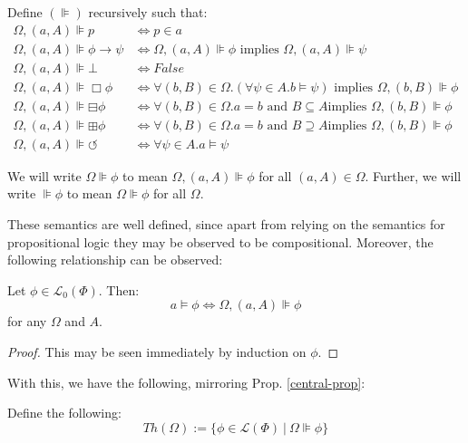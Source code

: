 \begin{definition}
 Define $(\VDash)$ recursively such that:
\begin{align*}
  {\Omega},(a,A){\VDash} p & {\iff}p{\in}a\\
  {\Omega},(a,A){\VDash} {\phi}{\rightarrow}{\psi} &
  {\iff}{\Omega},(a,A){\VDash}{\phi}\text{ implies
  }{\Omega},(a,A){\VDash}{\psi}\\
  {\Omega},(a,A){\VDash}{\bot} & {\iff} False\\
  {\Omega},(a,A){\VDash}\Box {\phi} & {\iff}{\forall}(b,B){\in}{\Omega}.
  ({\forall}{\psi}{\in}A. b{\models}{\psi})\text{ implies
  }{\Omega},(b,B){\VDash}{\phi}\\
  {\Omega},(a,A){\VDash}{\boxminus}{\phi} &
  {\iff}{\forall}(b,B){\in}{\Omega}. a=b\text{ and }B{\subseteq}A\text{
  implies }{\Omega},(b,B){\VDash}{\phi}\\
  {\Omega},(a,A){\VDash}{\boxplus}{\phi} &
  {\iff}{\forall}(b,B){\in}{\Omega}. a=b\text{ and }B{\supseteq}A\text{
  implies }{\Omega},(b,B){\VDash}{\phi}\\
  {\Omega},(a,A){\VDash}{\circlearrowleft} & {\iff}
  {\forall}{\psi}{\in}A.a{\models}{\psi}
\end{align*}
\end{definition}
\begin{remark}
We will write $\Omega \VDash \phi$ to mean $\Omega, (a,A) \VDash \phi$
for all $(a,A) \in \Omega$.  Further, we will write $\VDash \phi$ to
mean $\Omega \VDash \phi$ for all $\Omega$.
\end{remark}
These semantics are well defined, since apart from relying on the semantics
for propositional logic they may be observed to be compositional.
Moreover, the following relationship can be observed:

\begin{lemma}[Truthiness]\label{truthiness}
  Let $\phi \in \mathcal{L}_0 (\Phi)$.  Then:
  \[ a \models \phi \Longleftrightarrow \Omega, (a, A) \VDash \phi \]
  for any $\Omega$ and $A$.
\end{lemma}
\begin{proof}
  This may be seen immediately by induction on $\phi$.
\end{proof}

With this, we have the following, mirroring Prop. \ref{central-prop}:
\begin{definition}  Define the following:
 $$Th(\Omega) := \{ \phi \in \mathcal{L}(\Phi) \ |\ \Omega \VDash \phi \}$$
\end{definition}

